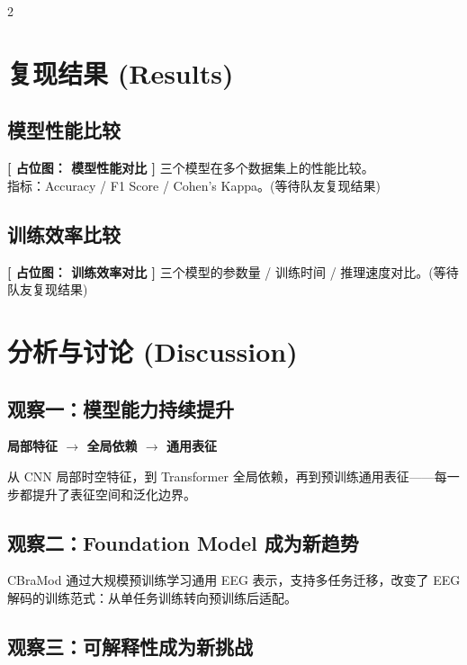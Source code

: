 \documentclass[12pt, a0paper]{article}
\renewcommand{\large}{\fontsize{24}{32}\selectfont}
\renewcommand{\Large}{\fontsize{28}{36}\selectfont}
\renewcommand{\small}{\fontsize{16}{22}\selectfont}
\newcommand{\placeholderh}[3]{%
    \begin{center}
    \colorbox{mygray!12}{\parbox{0.9\columnwidth}{%
        \centering
        \vspace{1.2em}
        {\Large\bfseries\color{mygray} [ 占位图： #1 ]}
        \vspace{0.8em}
        {\small\color{mygray} #2}
        \vspace{#3}
    }}
    \end{center}
}
\begin{document}
\begin{multicols}{2}
\section{复现结果 (Results)}

\subsection{模型性能比较}

\placeholderh{模型性能对比}{%
    三个模型在多个数据集上的性能比较。\\
    指标：Accuracy / F1 Score / Cohen's Kappa。\quad (等待队友复现结果)}{4.5cm}

\subsection{训练效率比较}

\placeholderh{训练效率对比}{%
    三个模型的参数量 / 训练时间 / 推理速度对比。\quad (等待队友复现结果)}{3.2cm}

\section{分析与讨论 (Discussion)}

\subsection{观察一：模型能力持续提升}

\begin{center}
\large\bfseries
局部特征 \quad $\longrightarrow$ \quad 全局依赖 \quad $\longrightarrow$ \quad 通用表征
\end{center}

从 CNN 局部时空特征，到 Transformer 全局依赖，再到预训练通用表征——每一步都提升了表征空间和泛化边界。

\subsection{观察二：Foundation Model 成为新趋势}

CBraMod 通过大规模预训练学习通用 EEG 表示，支持多任务迁移，改变了 EEG 解码的训练范式：从单任务训练转向预训练后适配。

\subsection{观察三：可解释性成为新挑战}


\end{multicols}
\end{document}
